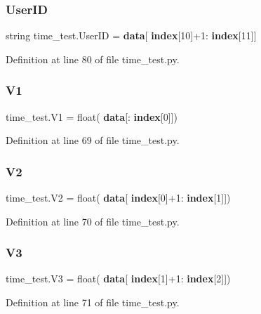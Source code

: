 \subsubsection{User\+ID}
{\footnotesize\ttfamily string time\+\_\+test.\+User\+ID = \textbf{ data}[\textbf{ index}[10]+1\+:\textbf{ index}[11]]}



Definition at line 80 of file time\+\_\+test.\+py.

\mbox{\label{namespacetime__test_aff25606f52444ff7c4937806a75f78ad}} 
\subsubsection{V1}
{\footnotesize\ttfamily time\+\_\+test.\+V1 = float(\textbf{ data}[\+:\textbf{ index}[0]])}



Definition at line 69 of file time\+\_\+test.\+py.

\mbox{\label{namespacetime__test_ac963f484ad314bcca3b2cd2fc358a039}} 
\subsubsection{V2}
{\footnotesize\ttfamily time\+\_\+test.\+V2 = float(\textbf{ data}[\textbf{ index}[0]+1\+:\textbf{ index}[1]])}



Definition at line 70 of file time\+\_\+test.\+py.

\mbox{\label{namespacetime__test_a73fc3c1b572038f358497152ca5ecc16}} 
\subsubsection{V3}
{\footnotesize\ttfamily time\+\_\+test.\+V3 = float(\textbf{ data}[\textbf{ index}[1]+1\+:\textbf{ index}[2]])}



Definition at line 71 of file time\+\_\+test.\+py.

\mbox{\label{namespacetime__test_a93fde91c33e36359ee1a1925f61c4afa}} 
